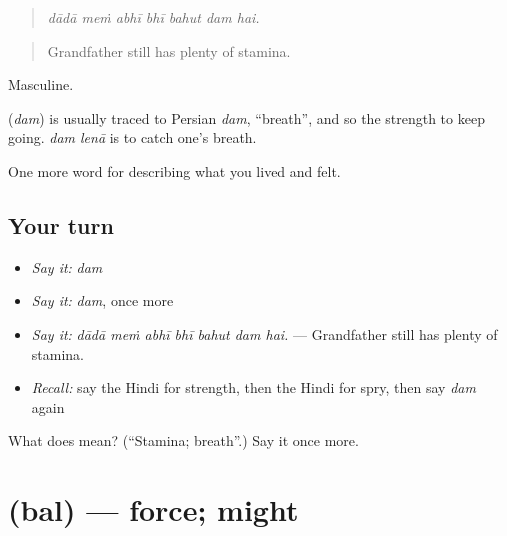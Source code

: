 \begin{quote}
      
\end{quote}

\begin{quote}
\emph{dādā meṁ abhī bhī bahut dam hai.}
\end{quote}

\begin{quote}
Grandfather still has plenty of stamina.
\end{quote}

Masculine.

\begin{cousinweb}
\textbf{} (\emph{dam}) is usually traced to Persian \emph{dam}, \textquotedblleft{}breath\textquotedblright{}, and so the strength to keep going. \emph{dam lenā} is to catch one's breath.
\end{cousinweb}

\begin{grammarlens}[title={What you've built}]
One more word for describing what you lived and felt.
\end{grammarlens}

\subsection*{Your turn}
\begin{itemize}
\raggedright
  \item \emph{Say it:} \emph{dam}
  \item \emph{Say it:} \emph{dam}, once more
  \item \emph{Say it:} \emph{dādā meṁ abhī bhī bahut dam hai.} — Grandfather still has plenty of stamina.
  \item \emph{Recall:} say the Hindi for strength, then the Hindi for spry, then say \emph{dam} again
\end{itemize}

\begin{tcolorbox}[breakable,colback=teal!4,colframe=teal!35!black,title={Before you move on}]
What does  mean? (\textquotedblleft{}Stamina; breath\textquotedblright{}.) Say it once more.
\end{tcolorbox}
\section[\texorpdfstring{\hi{बल} (bal)}{बल (bal)}]{ (bal) — force; might}

\label{lesson:HI-C483-bal}



